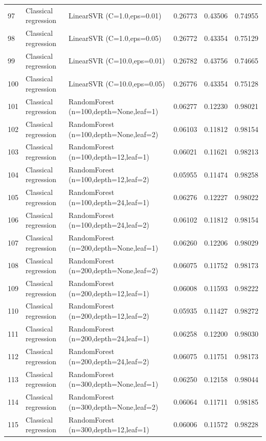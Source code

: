 \documentclass[10pt]{article}
\begin{document}
\begin{longtable}{C{0.75cm}L{2.35cm}L{8.0cm}C{1.15cm}C{1.15cm}C{1.15cm}}
97 & Classical regression & LinearSVR (C=1.0,eps=0.01) & 0.26773 & 0.43506 & 0.74955 \\
98 & Classical regression & LinearSVR (C=1.0,eps=0.05) & 0.26772 & 0.43354 & 0.75129 \\
99 & Classical regression & LinearSVR (C=10.0,eps=0.01) & 0.26782 & 0.43756 & 0.74665 \\
100 & Classical regression & LinearSVR (C=10.0,eps=0.05) & 0.26776 & 0.43354 & 0.75128 \\
101 & Classical regression & RandomForest (n=100,depth=None,leaf=1) & 0.06277 & 0.12230 & 0.98021 \\
102 & Classical regression & RandomForest (n=100,depth=None,leaf=2) & 0.06103 & 0.11812 & 0.98154 \\
103 & Classical regression & RandomForest (n=100,depth=12,leaf=1) & 0.06021 & 0.11621 & 0.98213 \\
104 & Classical regression & RandomForest (n=100,depth=12,leaf=2) & 0.05955 & 0.11474 & 0.98258 \\
105 & Classical regression & RandomForest (n=100,depth=24,leaf=1) & 0.06276 & 0.12227 & 0.98022 \\
106 & Classical regression & RandomForest (n=100,depth=24,leaf=2) & 0.06102 & 0.11812 & 0.98154 \\
107 & Classical regression & RandomForest (n=200,depth=None,leaf=1) & 0.06260 & 0.12206 & 0.98029 \\
108 & Classical regression & RandomForest (n=200,depth=None,leaf=2) & 0.06075 & 0.11752 & 0.98173 \\
109 & Classical regression & RandomForest (n=200,depth=12,leaf=1) & 0.06008 & 0.11593 & 0.98222 \\
110 & Classical regression & RandomForest (n=200,depth=12,leaf=2) & 0.05935 & 0.11427 & 0.98272 \\
111 & Classical regression & RandomForest (n=200,depth=24,leaf=1) & 0.06258 & 0.12200 & 0.98030 \\
112 & Classical regression & RandomForest (n=200,depth=24,leaf=2) & 0.06075 & 0.11751 & 0.98173 \\
113 & Classical regression & RandomForest (n=300,depth=None,leaf=1) & 0.06250 & 0.12158 & 0.98044 \\
114 & Classical regression & RandomForest (n=300,depth=None,leaf=2) & 0.06064 & 0.11711 & 0.98185 \\
115 & Classical regression & RandomForest (n=300,depth=12,leaf=1) & 0.06006 & 0.11572 & 0.98228 \\

\end{longtable}
\end{document}
